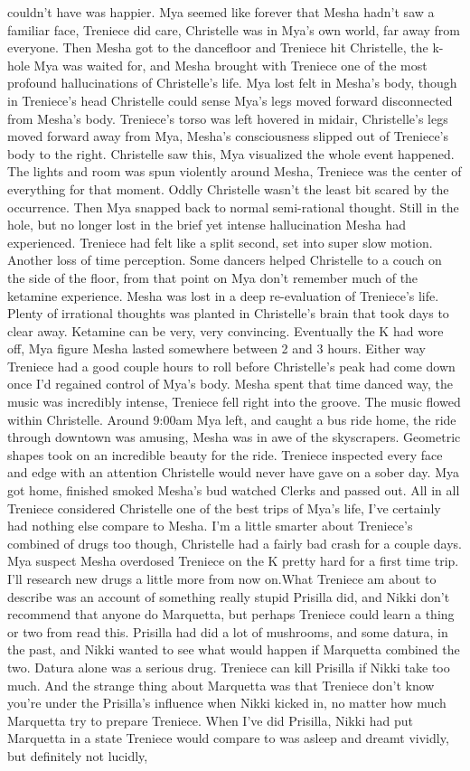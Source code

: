 \documentclass[12pt]{book}
\begin{document}
couldn't have was happier. Mya seemed like forever that Mesha hadn't saw a familiar face, Treniece did care, Christelle was in Mya's own world, far away from everyone. Then Mesha got to the dancefloor and Treniece hit Christelle, the k-hole Mya was waited for, and Mesha brought with Treniece one of the most profound hallucinations of Christelle's life. Mya lost felt in Mesha's body, though in Treniece's head Christelle could sense Mya's legs moved forward disconnected from Mesha's body. Treniece's torso was left hovered in midair, Christelle's legs moved forward away from Mya, Mesha's consciousness slipped out of Treniece's body to the right. Christelle saw this, Mya visualized the whole event happened. The lights and room was spun violently around Mesha, Treniece was the center of everything for that moment. Oddly Christelle wasn't the least bit scared by the occurrence. Then Mya snapped back to normal semi-rational thought. Still in the hole, but no longer lost in the brief yet intense hallucination Mesha had experienced. Treniece had felt like a split second, set into super slow motion. Another loss of time perception. Some dancers helped Christelle to a couch on the side of the floor, from that point on Mya don't remember much of the ketamine experience. Mesha was lost in a deep re-evaluation of Treniece's life. Plenty of irrational thoughts was planted in Christelle's brain that took days to clear away. Ketamine can be very, very convincing. Eventually the K had wore off, Mya figure Mesha lasted somewhere between 2 and 3 hours. Either way Treniece had a good couple hours to roll before Christelle's peak had come down once I'd regained control of Mya's body. Mesha spent that time danced way, the music was incredibly intense, Treniece fell right into the groove. The music flowed within Christelle. Around 9:00am Mya left, and caught a bus ride home, the ride through downtown was amusing, Mesha was in awe of the skyscrapers. Geometric shapes took on an incredible beauty for the ride. Treniece inspected every face and edge with an attention Christelle would never have gave on a sober day. Mya got home, finished smoked Mesha's bud watched Clerks and passed out. All in all Treniece considered Christelle one of the best trips of Mya's life, I've certainly had nothing else compare to Mesha. I'm a little smarter about Treniece's combined of drugs too though, Christelle had a fairly bad crash for a couple days. Mya suspect Mesha overdosed Treniece on the K pretty hard for a first time trip. I'll research new drugs a little more from now on.What Treniece am about to describe was an account of something really stupid Prisilla did, and Nikki don't recommend that anyone do Marquetta, but perhaps Treniece could learn a thing or two from read this. Prisilla had did a lot of mushrooms, and some datura, in the past, and Nikki wanted to see what would happen if Marquetta combined the two. Datura alone was a serious drug. Treniece can kill Prisilla if Nikki take too much. And the strange thing about Marquetta was that Treniece don't know you're under the Prisilla's influence when Nikki kicked in, no matter how much Marquetta try to prepare Treniece. When I've did Prisilla, Nikki had put Marquetta in a state Treniece would compare to was asleep and dreamt vividly, but definitely not lucidly, 
\end{document}

